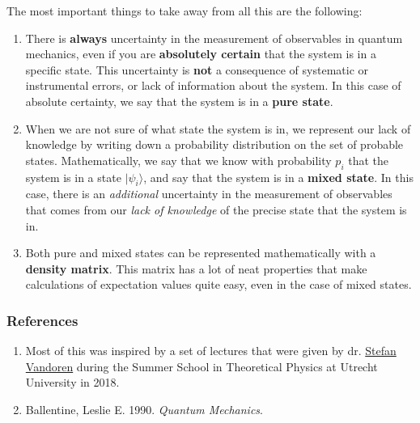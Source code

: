 \documentclass[a4]{article}
\providecommand{\tightlist}{%
  \setlength{\itemsep}{0pt}\setlength{\parskip}{0pt}}
\begin{document}
The most important things to take away from all this are the
following:

\begin{enumerate}
\def\labelenumi{\arabic{enumi}.}
\tightlist
\item There is \textbf{always} uncertainty in the measurement of
observables in quantum mechanics, even if you are \textbf{absolutely
certain} that the system is in a specific state. This uncertainty is
\textbf{not} a consequence of systematic or instrumental errors, or lack
of information about the system. In this case of absolute certainty, we
say that the system is in a \textbf{pure state}.

\item When we are not sure of what state the system is in, we represent our lack of knowledge by
writing down a probability distribution on the set of probable states.
Mathematically, we say that we know with probability $p_i$ that the
system is in a state $\vert\psi_i\rangle$, and say that the system is
in a \textbf{mixed state}. In this case, there is an \emph{additional}
uncertainty in the measurement of observables that comes from our
\emph{lack of knowledge} of the precise state that the system is in.

\item Both pure and mixed states can be represented mathematically with a
\textbf{density matrix}. This matrix has a lot of neat properties that
make calculations of expectation values quite easy, even in the case of
mixed states.
\end{enumerate}

\subsubsection{References}\label{references}

\begin{enumerate}
\def\labelenumi{\arabic{enumi}.}
\tightlist
\item
  Most of this was inspired by a set of lectures that were given by dr.
  \href{http://www.staff.science.uu.nl/~vando101/}{Stefan Vandoren}
  during the Summer School in Theoretical Physics at Utrecht University
  in 2018.
\item
  Ballentine, Leslie E. 1990. \emph{Quantum Mechanics}.
\end{enumerate}
\end{document}
